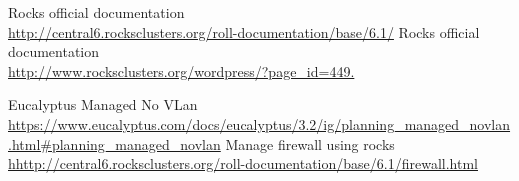 \cleardoublepage
{}
{}
\begin{thebibliography}{99}

 Rocks official documentation \\ \url{http://central6.rocksclusters.org/roll-documentation/base/6.1/}
 Rocks official documentation \\ \url{http://www.rocksclusters.org/wordpress/?page_id=449.}

 Eucalyptus Managed No VLan \\ \url{https://www.eucalyptus.com/docs/eucalyptus/3.2/ig/planning_managed_novlan.html#planning_managed_novlan}
 Manage firewall using rocks \\ \url{hhttp://central6.rocksclusters.org/roll-documentation/base/6.1/firewall.html}
\end{thebibliography}
